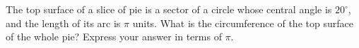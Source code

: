 The top surface of a slice of pie is a sector of a circle whose central angle is $20^\circ$, and the length of its arc is $\pi$ units. What is the circumference of the top surface of the whole pie? Express your answer in terms of $\pi$.
